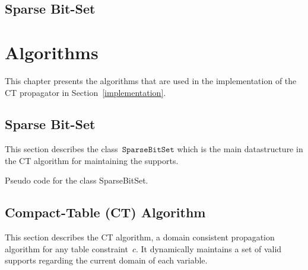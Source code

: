 \documentclass[a4paper,11pt]{article}
\newcommand{\Chapref}[1]{Section~\ref{#1}}
\newcommand{\SparseBitSet}{\texttt{SparseBitSet}}
\numberwithin{equation}{section}
\begin{document}
\subsection{Sparse Bit-Set}
\label{bg:sbc}

\section{Algorithms}
\label{algorithms}


This chapter presents the algorithms that are used in the implementation of the
CT propagator in \Chapref{implementation}.

\subsection{Sparse Bit-Set}
This section describes the class~$\SparseBitSet$ which is the main datastructure
in the CT algorithm for maintaining the supports.

\begin{algorithm}[h]
  \begin{algorithmic}[1]  %
    
    \end{algorithmic}
  \caption{Pseudo code for the class SparseBitSet.}
  \label{algo:sparse}
\end{algorithm}

\subsection{Compact-Table (CT) Algorithm}
This section describes the CT algorithm, a domain consistent propagation
algorithm for any table constraint~$c$.
It dynamically maintains a set of valid supports regarding the current domain of each variable.

\end{document}
